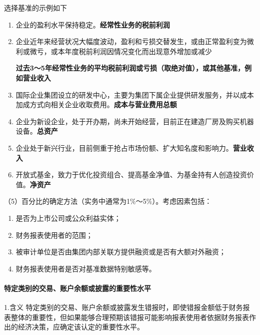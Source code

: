 \documentclass[UTF8,12pt]{ctexart}
\numberwithin{equation}{section} %
\numberwithin{figure}{section}
\numberwithin{table}{section}
\begin{document}
	选择基准的示例如下
	\begin{enumerate}
		\item 企业的盈利水平保持稳定。\textbf{经常性业务的税前利润}
		
		
		\item 企业近年来经营状况大幅度波动，盈利和亏损交替发生，或由正常盈利变为微利或微亏，或本年度税前利润因情况变化而出现意外增加或减少
		
		\textbf{过去3～5年经常性业务的平均税前利润或亏损（取绝对值），或其他基准，例如营业收入}
		
		\item 国际企业集团设立的研发中心，主要为集团下属企业提供研发服务，并以成本加成方式向相关企业收取费用。\textbf{成本与营业费用总额}
		
		\item 企业为新设企业，处于开办期，尚未开始经营，目前正在建造厂房及购买机器设备。\textbf{总资产}
		
		\item 企业处于新兴行业，目前侧重于抢占市场份额、扩大知名度和影响力。\textbf{营业收入}
		
		\item 开放式基金，致力于优化投资组合、提高基金净值、为基金持有人创造投资价值。\textbf{净资产}
		
	\end{enumerate}
	
	
	（5）百分比的确定方法（实务中通常为1\%～5\%）。考虑因素包括：
	\begin{enumerate}
		\item 是否为上市公司或公众利益实体；
		
		\item 财务报表使用者的范围；
		
		\item 被审计单位是否由集团内部关联方提供融资或是否有大额对外融资；
		
		\item 财务报表使用者是否对基准数据特别敏感等。
		
	\end{enumerate}
	
	\paragraph{特定类别的交易、账户余额或披露的重要性水平}
	1.含义
	特定类别的交易、账户余额或披露发生错报时，即使错报金额低于财务报表整体的重要性，但如果能够合理预期该错报可能影响报表使用者依据财务报表作出的经济决策，应确定该认定的重要性水平。
	
\end{document}
